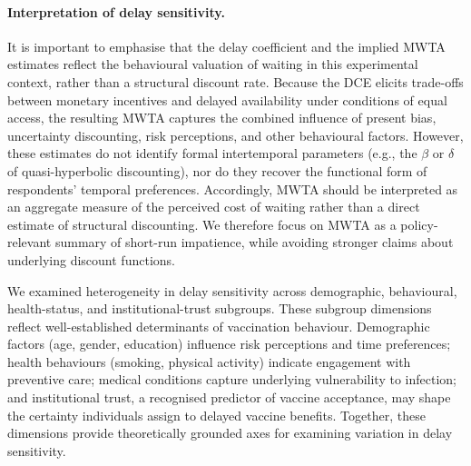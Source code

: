 \documentclass[12pt]{article}
\begin{document}
\medskip

\paragraph{Interpretation of delay sensitivity.}
It is important to emphasise that the delay coefficient and the implied MWTA estimates 
reflect the behavioural valuation of waiting in this experimental context, rather than a 
structural discount rate. Because the DCE elicits trade-offs between monetary incentives and 
delayed availability under conditions of equal access, the resulting MWTA captures the 
combined influence of present bias, uncertainty discounting, risk perceptions, and other 
behavioural factors. However, these estimates do not identify formal intertemporal 
parameters (e.g., the $\beta$ or $\delta$ of quasi-hyperbolic discounting), nor do they 
recover the functional form of respondents' temporal preferences. Accordingly, MWTA should be 
interpreted as an aggregate measure of the perceived cost of waiting rather than a direct 
estimate of structural discounting. We therefore focus on MWTA as a policy-relevant summary 
of short-run impatience, while avoiding stronger claims about underlying discount functions.


\clearpage

\clearpage
We examined heterogeneity in delay sensitivity across demographic, behavioural, health-status, 
and institutional-trust subgroups. These subgroup dimensions reflect well-established 
determinants of vaccination behaviour. Demographic factors (age, gender, education) influence 
risk perceptions and time preferences; health behaviours (smoking, physical activity) indicate 
engagement with preventive care; medical conditions capture underlying vulnerability to 
infection; and institutional trust, a recognised predictor of vaccine acceptance, may shape the 
certainty individuals assign to delayed vaccine benefits. Together, these dimensions provide 
theoretically grounded axes for examining variation in delay sensitivity.
\end{document}
